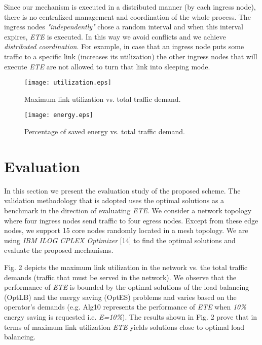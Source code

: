 \documentclass[journal]{IEEEtran}
\begin{document}
Since our mechanism is executed in a distributed manner (by each ingress node), there is no centralized management and coordination of the whole process. The ingress nodes \emph{"independently"} chose a random interval and when this interval expires, \emph{ETE} is executed. In this way we avoid conflicts and we achieve \emph{distributed coordination}. For example, in case that an ingress node puts some traffic to a specific link (increases its utilization) the other ingress nodes that will execute \emph{ETE} are not allowed to turn that link into sleeping mode.

\begin{figure}\vspace{-0.2in}
\centering
\texttt{[image: utilization.eps]}\vspace{-0.1in}
\caption{Maximum link utilization vs. total traffic demand.} \label{fig2}
\vspace{-0.15in}
\end{figure}

\begin{figure}\centering
\texttt{[image: energy.eps]}\vspace{-0.1in}
\caption{Percentage of saved energy vs. total traffic demand.} \label{fig3}
\vspace{-0.2in}
\end{figure}

\section{Evaluation}
In this section we present the evaluation study of the proposed scheme. The validation methodology that is adopted uses the optimal solutions as a benchmark in the direction of evaluating \emph{ETE}. We consider a network topology where four ingress nodes send traffic to four egress nodes. Except from these edge nodes, we support 15 core nodes randomly located in a mesh topology. We are using \emph{IBM ILOG CPLEX Optimizer} [14] to find the optimal solutions and evaluate the proposed mechanisms.

Fig. 2 depicts the maximum link utilization in the network vs. the total traffic demands (traffic that must be served in the network). We observe that the performance of \emph{ETE} is bounded by the optimal solutions of the load balancing (OptLB) and the energy saving (OptES) problems and varies based on the operator's demands (e.g. Alg10 represents the performance of \emph{ETE} when \emph{10\%} energy saving is requested i.e. \emph{E=10\%}). The results shown in Fig. 2 prove that in terms of maximum link utilization \emph{ETE} yields solutions close to optimal load balancing.
\end{document}
